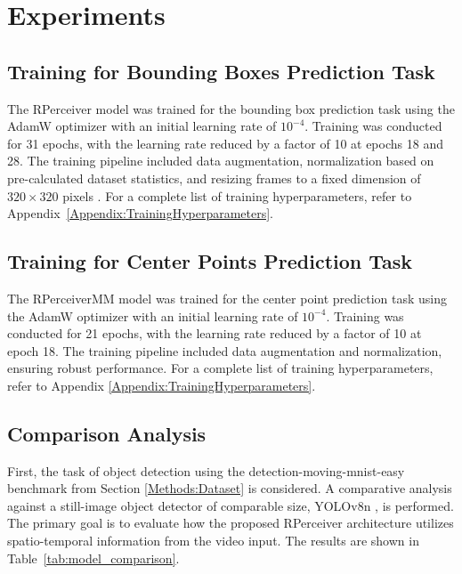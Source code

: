 \section{Experiments}  \label{Experiments}



\subsection{Training for Bounding Boxes Prediction Task} \label{Experiments:TrainingBoundingBoxesTask}

The RPerceiver model was trained for the bounding box prediction task using the AdamW optimizer \cite{loshchilovDecoupledWeightDecay2019a} with an initial learning rate of $10^{-4}$. Training was conducted for 31 epochs, with the learning rate reduced by a factor of 10 at epochs 18 and 28. The training pipeline included data augmentation, normalization based on pre-calculated dataset statistics, and resizing frames to a fixed dimension of $320 \times 320$ pixels \cite{redmonYOLO9000BetterFaster2016}. For a complete list of training hyperparameters, refer to Appendix~\ref{Appendix:TrainingHyperparameters}.

\subsection{Training for Center Points Prediction Task} \label{Experiments:TrainingCenterPointsTask}

The RPerceiverMM model was trained for the center point prediction task using the AdamW optimizer \cite{loshchilovDecoupledWeightDecay2019a} with an initial learning rate of $10^{-4}$. Training was conducted for 21 epochs, with the learning rate reduced by a factor of 10 at epoch 18. The training pipeline included data augmentation and normalization, ensuring robust performance. For a complete list of training hyperparameters, refer to Appendix \ref{Appendix:TrainingHyperparameters}.

\subsection{Comparison Analysis} \label{Experiments:ComparisonAnalysis}

First, the task of object detection using the detection-moving-mnist-easy benchmark from Section \ref{Methods:Dataset} is considered. A comparative analysis against a still-image object detector of comparable size, YOLOv8n \cite{Jocher_Ultralytics_YOLO_2023}, is performed. The primary goal is to evaluate how the proposed RPerceiver architecture utilizes spatio-temporal information from the video input. The results are shown in Table~\ref{tab:model_comparison}.

